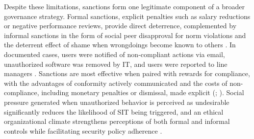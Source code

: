 \documentclass[12pt,oneside]{article}
\begin{document}
Despite these limitations, sanctions form one legitimate component of a broader governance strategy. Formal sanctions, explicit penalties such as salary reductions or negative performance reviews, provide direct deterrence, complemented by informal sanctions in the form of social peer disapproval for norm violations and the deterrent effect of shame when wrongdoings become known to others \citep[1024, 1026, 1027]{silic2017perspective}. In documented cases, users were notified of non-compliant actions via email, unauthorized software was removed by \ac{IT}, and users were reported to line managers \citep[1029]{silic2017perspective}. Sanctions are most effective when paired with rewards for compliance, with the advantages of conformity actively communicated and the costs of non-compliance, including monetary penalties or dismissal, made explicit (\citealp[11]{roeder2014managers}; \citealp[739]{haag2019acceptance}). Social pressure generated when unauthorized behavior is perceived as undesirable significantly reduces the likelihood of \ac{SIT} being triggered, and an ethical organizational climate strengthens perceptions of both formal and informal controls while facilitating security policy adherence \citep[506, 500, 510]{nguyen2024understanding}.
\end{document}
